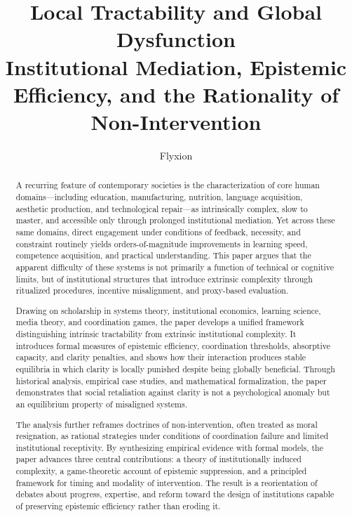 \documentclass[11pt]{article}
\title{Local Tractability and Global Dysfunction\\
Institutional Mediation, Epistemic Efficiency, and the Rationality of Non-Intervention}
\author{Flyxion}
\date{\todat}
\begin{document}
\maketitle

\begin{abstract}
A recurring feature of contemporary societies is the characterization of core human domains---including education, manufacturing, nutrition, language acquisition, aesthetic production, and technological repair---as intrinsically complex, slow to master, and accessible only through prolonged institutional mediation. Yet across these same domains, direct engagement under conditions of feedback, necessity, and constraint routinely yields orders-of-magnitude improvements in learning speed, competence acquisition, and practical understanding. This paper argues that the apparent difficulty of these systems is not primarily a function of technical or cognitive limits, but of institutional structures that introduce extrinsic complexity through ritualized procedures, incentive misalignment, and proxy-based evaluation.

Drawing on scholarship in systems theory, institutional economics, learning science, media theory, and coordination games, the paper develops a unified framework distinguishing intrinsic tractability from extrinsic institutional complexity. It introduces formal measures of epistemic efficiency, coordination thresholds, absorptive capacity, and clarity penalties, and shows how their interaction produces stable equilibria in which clarity is locally punished despite being globally beneficial. Through historical analysis, empirical case studies, and mathematical formalization, the paper demonstrates that social retaliation against clarity is not a psychological anomaly but an equilibrium property of misaligned systems.

The analysis further reframes doctrines of non-intervention, often treated as moral resignation, as rational strategies under conditions of coordination failure and limited institutional receptivity. By synthesizing empirical evidence with formal models, the paper advances three central contributions: a theory of institutionally induced complexity, a game-theoretic account of epistemic suppression, and a principled framework for timing and modality of intervention. The result is a reorientation of debates about progress, expertise, and reform toward the design of institutions capable of preserving epistemic efficiency rather than eroding it.
\end{abstract}
\end{document}
